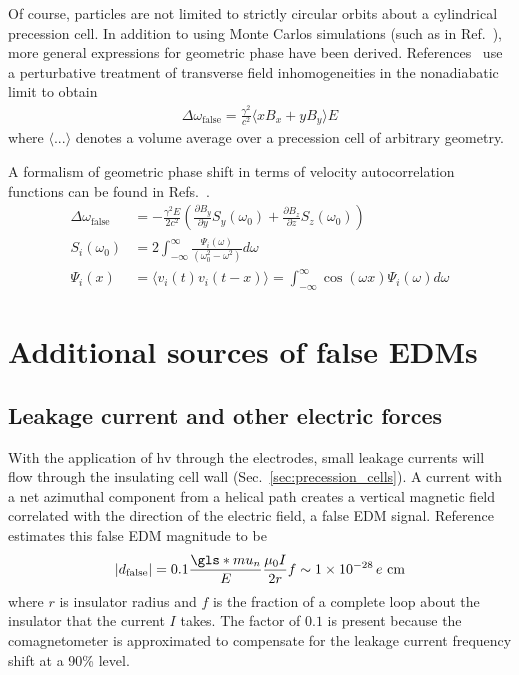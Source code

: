 Of course, particles are not limited to strictly circular orbits about a cylindrical precession cell. In addition to using Monte Carlos simulations (such as in Ref.~\cite{pignol_magic_2019}), more general expressions for geometric phase have been derived. References~\cite{pignol_geometric_phase_2012, pignol_geometric_phase_2015} use a perturbative treatment of transverse field inhomogeneities in the nonadiabatic limit to obtain
%
\begin{gather}
    \Delta\omega_\text{false} = \frac{\gamma^2}{c^2}\langle xB_x + yB_y \rangle E
\end{gather}
%
where $\langle ... \rangle$ denotes a volume average over a precession cell of arbitrary geometry.

A formalism of geometric phase shift in terms of velocity autocorrelation functions can be found in Refs.~\cite{lamoreaux_geometric_phase_2005, barabanov_geometric_phase_2006, swank_geometric_phase_2009}.
%
\begin{align}
    \Delta\omega_\text{false} &= -\frac{\gamma^2 E}{2c^2}\left( \frac{\partial B_y}{\partial y} S_y(\omega_0) + \frac{\partial B_z}{\partial z} S_z(\omega_0) \right) \\
    S_i(\omega_0) &= 2\int_{-\infty}^{\infty} \frac{\Psi_i(\omega)}{(\omega_0^2 - \omega^2)}d\omega \\
    \Psi_i(x) &= \langle v_i(t)v_i(t-x) \rangle = \int_{-\infty}^{\infty}\cos (\omega x) \Psi_i (\omega) d\omega
\end{align}



\section{Additional sources of false EDMs}


\subsection*{Leakage current and other electric forces}

With the application of \acrshort{hv} through the electrodes, small leakage currents will flow through the insulating cell wall (Sec.~\ref{sec:precession_cells}). A current with a net azimuthal component from a helical path creates a vertical magnetic field correlated with the direction of the electric field, a false EDM signal. Reference~\cite{baker_apparatus_2014} estimates this false EDM magnitude to be
%
\begin{gather}
    | d_\text{false} | = 0.1\frac{\gls*{mu_n}}{E}\frac{\mu_0 I}{2r}f \sim \num{1e-28}\,e\text{ cm}
\end{gather}
%
where $r$ is insulator radius and $f$ is the fraction of a complete loop about the insulator that the current $I$ takes. The factor of $0.1$ is present because the \hg comagnetometer is approximated to compensate for the leakage current frequency shift at a 90\% level.

